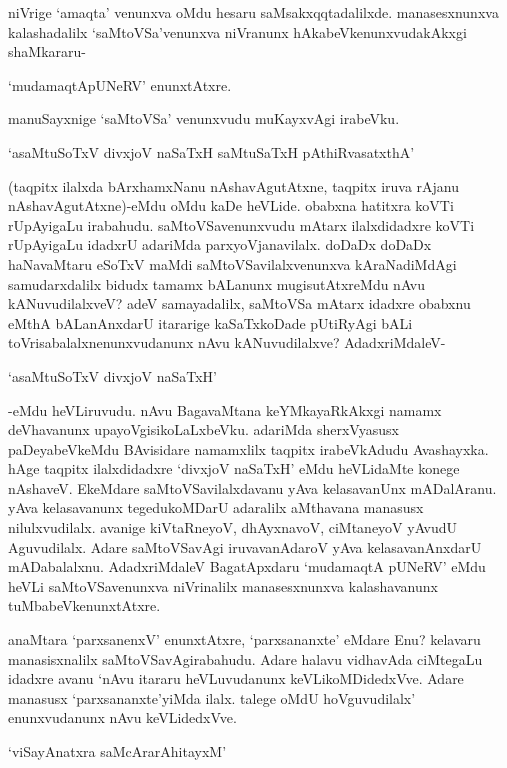 niVrige `amaqta' venunxva oMdu hesaru saMsakxqqtadalilxde. manasesxnunxva kalashadalilx `saMtoVSa'venunxva niVranunx hAkabeVkenunxvudakAkxgi shaMkararu-

\begin{center}
`mudamaqtApUNeRV' enunxtAtxre.
\end{center}

manuSayxnige `saMtoVSa' venunxvudu muKayxvAgi irabeVku.

\begin{shloka}
`asaMtuSoTxV divxjoV naSaTxH saMtuSaTxH pAthiRvasatxthA'
\end{shloka}

(taqpitx ilalxda bArxhamxNanu nAshavAgutAtxne, taqpitx iruva rAjanu nAshavAgutAtxne)-eMdu oMdu kaDe heVLide. obabxna hatitxra koVTi rUpAyigaLu irabahudu. saMtoVSavenunxvudu mAtarx ilalxdidadxre koVTi rUpAyigaLu idadxrU adariMda parxyoVjanavilalx. doDaDx doDaDx haNavaMtaru eSoTxV maMdi saMtoVSavilalxvenunxva kAraNadiMdAgi samudarxdalilx bidudx tamamx bALanunx mugisutAtxreMdu nAvu kANuvudilalxveV? adeV samayadalilx, saMtoVSa mAtarx idadxre obabxnu eMthA bALanAnxdarU itararige kaSaTxkoDade pUtiRyAgi bALi toVrisabalalxnenunxvudanunx nAvu kANuvudilalxve? AdadxriMdaleV-

\begin{shloka}
`asaMtuSoTxV divxjoV naSaTxH'
\end{shloka}

-eMdu heVLiruvudu. nAvu BagavaMtana keYMkayaRkAkxgi namamx deVhavanunx upayoVgisikoLaLxbeVku. adariMda sherxVyasusx paDeyabeVkeMdu BAvisidare namamxlilx taqpitx irabeVkAdudu Avashayxka. hAge taqpitx ilalxdidadxre `divxjoV naSaTxH' eMdu heVLidaMte konege nAshaveV. EkeMdare saMtoVSavilalxdavanu yAva kelasavanUnx mADalAranu. yAva kelasavanunx tegedukoMDarU adaralilx aMthavana manasusx nilulxvudilalx. avanige kiVtaRneyoV, dhAyxnavoV, ciMtaneyoV yAvudU Aguvudilalx. Adare saMtoVSavAgi iruvavanAdaroV yAva kelasavanAnxdarU mADabalalxnu. AdadxriMdaleV BagatApxdaru `mudamaqtA pUNeRV' eMdu heVLi saMtoVSavenunxva niVrinalilx manasesxnunxva kalashavanunx tuMbabeVkenunxtAtxre.

anaMtara `parxsanenxV' enunxtAtxre, `parxsananxte' eMdare Enu? kelavaru manasisxnalilx saMtoVSavAgirabahudu. Adare halavu vidhavAda ciMtegaLu idadxre avanu `nAvu itararu heVLuvudanunx keVLikoMDidedxVve. Adare manasusx `parxsananxte'yiMda ilalx. talege oMdU hoVguvudilalx' enunxvudanunx nAvu keVLidedxVve.

\begin{shloka}
`viSayAnatxra saMcArarAhitayxM'
\end{shloka}

